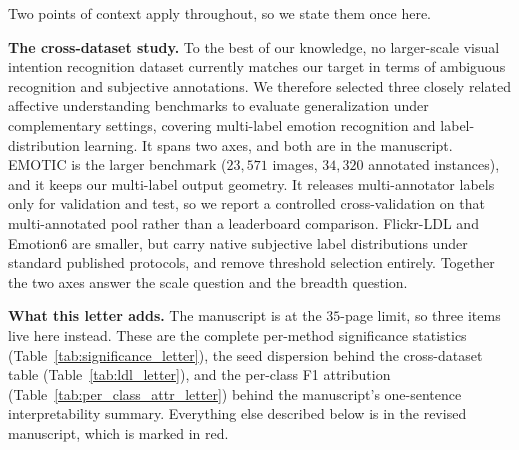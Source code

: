 Two points of context apply throughout, so we state them once here.

\textbf{The cross-dataset study.} To the best of our knowledge, no larger-scale visual intention recognition dataset currently matches our target in terms of ambiguous recognition and subjective annotations. We therefore selected three closely related affective understanding benchmarks to evaluate generalization under complementary settings, covering multi-label emotion recognition and label-distribution learning.
It spans two axes, and both are in the manuscript. EMOTIC is the larger benchmark ($23{,}571$ images, $34{,}320$ annotated instances), and it keeps our multi-label output geometry. It releases multi-annotator labels only for validation and test, so we report a controlled cross-validation on that multi-annotated pool rather than a leaderboard comparison. Flickr-LDL and Emotion6 are smaller, but carry native subjective label distributions under standard published protocols, and remove threshold selection entirely. Together the two axes answer the scale question and the breadth question.

\textbf{What this letter adds.} The manuscript is at the $35$-page limit, so three items live here instead. These are the complete per-method significance statistics (Table~\ref{tab:significance_letter}), the seed dispersion behind the cross-dataset table (Table~\ref{tab:ldl_letter}), and the per-class F1 attribution (Table~\ref{tab:per_class_attr_letter}) behind the manuscript's one-sentence interpretability summary. Everything else described below is in the revised manuscript, which is marked in red.
